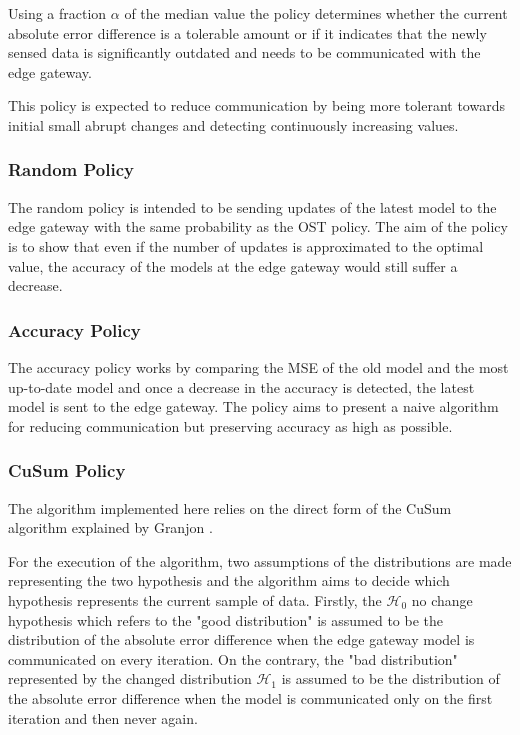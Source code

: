 \documentclass{mpaper}
\begin{document}
Using a fraction $\alpha$ of the median value the policy determines whether the current absolute error difference is a tolerable amount or if it indicates that the newly sensed data is significantly outdated and needs to be communicated with the edge gateway.

This policy is expected to reduce communication by being more tolerant towards initial small abrupt changes and detecting continuously increasing values.

\subsubsection{Random Policy}
The random policy is intended to be sending updates of the latest model to the edge gateway with the same probability as the OST policy.
The aim of the policy is to show that even if the number of updates is approximated to the optimal value, the accuracy of the models at the edge gateway would still suffer a decrease.

\subsubsection{Accuracy Policy}
The accuracy policy works by comparing the MSE of the old model and the most up-to-date model and once a decrease in the accuracy is detected, the latest model is sent to the edge gateway.
The policy aims to present a naive algorithm for reducing communication but preserving accuracy as high as possible.

\subsubsection{CuSum Policy}
The algorithm implemented here relies on the direct form of the CuSum algorithm explained by Granjon \cite{cusum_pierre}.

For the execution of the algorithm, two assumptions of the distributions are made representing the two hypothesis and the algorithm aims to decide which hypothesis represents the current sample of data. 
Firstly, the $\mathcal{H}_0$ no change hypothesis which refers to the "good distribution" is assumed to be the distribution of the absolute error difference when the edge gateway model is communicated on every iteration. On the contrary, the "bad distribution" represented by the changed distribution $\mathcal{H}_1$ is assumed to be the distribution of the absolute error difference when the model is communicated only on the first iteration and then never again. 
\end{document}
